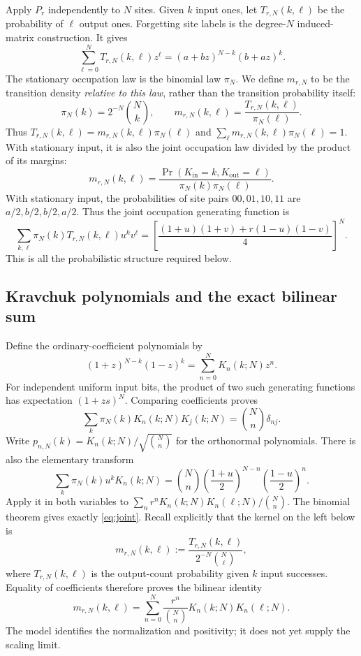 \documentclass[11pt,reqno]{amsart}
\theoremstyle{definition}
\theoremstyle{remark}
\begin{document}
Apply $P_r$ independently to $N$ sites. Given $k$ input ones, let
$T_{r,N}(k,\ell)$ be the probability of $\ell$ output ones. Forgetting
site labels is the degree-$N$ induced-matrix construction. It gives
\begin{equation}\label{eq:transitionGF}
\sum_{\ell=0}^NT_{r,N}(k,\ell)z^\ell
=(a+bz)^{N-k}(b+az)^k.
\end{equation}
The stationary occupation law is the binomial law $\pi_N$. We define
$m_{r,N}$ to be the transition density \emph{relative to this law},
rather than the transition probability itself:
\begin{equation}\label{eq:density}
\pi_N(k)=2^{-N}\binom Nk,\qquad
m_{r,N}(k,\ell)=\frac{T_{r,N}(k,\ell)}{\pi_N(\ell)}.
\end{equation}
Thus $T_{r,N}(k,\ell)=m_{r,N}(k,\ell)\pi_N(\ell)$ and
$\sum_\ell m_{r,N}(k,\ell)\pi_N(\ell)=1$. With stationary input, it is
also the joint occupation law divided by the product of its margins:
\[
m_{r,N}(k,\ell)=
\frac{\Pr(K_{\mathrm{in}}=k,K_{\mathrm{out}}=\ell)}
{\pi_N(k)\pi_N(\ell)}.
\]
With stationary input, the probabilities of site pairs $00,01,10,11$
are $a/2,b/2,b/2,a/2$. Thus the joint occupation generating function is
\begin{equation}\label{eq:joint}
\sum_{k,\ell}\pi_N(k)T_{r,N}(k,\ell)u^kv^\ell
=\left[\frac{(1+u)(1+v)+r(1-u)(1-v)}4\right]^N.
\end{equation}
This is all the probabilistic structure required below.

\subsection{Kravchuk polynomials and the exact bilinear sum}
Define the ordinary-coefficient polynomials by
\begin{equation}\label{eq:Kgen}
(1+z)^{N-k}(1-z)^k=\sum_{n=0}^NK_n(k;N)z^n.
\end{equation}
For independent uniform input bits, the product of two such generating
functions has expectation $(1+zs)^N$. Comparing coefficients proves
\begin{equation}\label{eq:Korth}
\sum_k\pi_N(k)K_n(k;N)K_j(k;N)=\binom Nn\delta_{nj}.
\end{equation}
Write $p_{n,N}(k)=K_n(k;N)/\sqrt{\binom Nn}$ for the orthonormal
polynomials. There is also the elementary transform
\[
\sum_k\pi_N(k)u^kK_n(k;N)
=\binom Nn\left(\frac{1+u}{2}\right)^{N-n}
\left(\frac{1-u}{2}\right)^n.
\]
Apply it in both variables to
$\sum_nr^nK_n(k;N)K_n(\ell;N)/\binom Nn$.
The binomial theorem gives exactly \eqref{eq:joint}.
Recall explicitly that the kernel on the left below is
\[
m_{r,N}(k,\ell):=\frac{T_{r,N}(k,\ell)}{2^{-N}\binom N\ell},
\]
where $T_{r,N}(k,\ell)$ is the output-count probability given $k$ input
successes. Equality of coefficients therefore proves the bilinear
identity
\begin{equation}\label{eq:finmehler}
\boxed{\displaystyle
m_{r,N}(k,\ell)=\sum_{n=0}^N
\frac{r^n}{\binom Nn}K_n(k;N)K_n(\ell;N).}
\end{equation}
The model identifies the normalization and positivity; it does not yet
supply the scaling limit.
\end{document}
